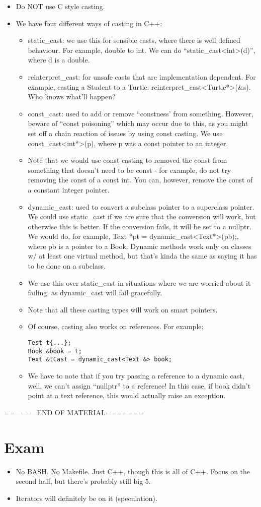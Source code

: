 \documentclass{article}
\begin{document}
\begin{itemize}
\item Do NOT use C style casting.
\item We have four different ways of casting in C++:
\begin{itemize}
\item static_cast: we use this for sensible casts, where there is well defined behaviour.  For example, double to int.  We can do ``static_cast<int>(d)'', where d is a double.
\item reinterpret_cast: for unsafe casts that are implementation dependent.  For example, casting a Student to a Turtle: reinterpret_cast<Turtle*>(&s).  Who knows what'll happen?
\item const_cast: used to add or remove ``constness' from something.  However, beware of ``const poisoning'' which may occur due to this, as you might set off a chain reaction of issues by using const casting.  We use const_cast<int*>(p), where p was a const pointer to an integer.  
\item Note that we would use const casting to removed the const from something that doesn't need to be const - for example, do not try removing the const of a const int.  You can, however, remove the const of a constant integer pointer.
\item dynamic_cast: used to convert a subclass pointer to a superclass pointer.  We could use static_cast if we are sure that the conversion will work, but otherwise this is better.  If the conversion fails, it will be set to a nullptr.  We would do, for example, Text *pt = dynamic_cast<Text*>(pb);, where pb is a pointer to a Book.  Dynamic methods work only on classes w/ at least one virtual method, but that's kinda the same as saying it has to be done on a subclass.  
\item We use this over static_cast in situations where we are worried about it failing, as dynamic_cast will fail gracefully.
\item Note that all these casting types will work on smart pointers.
\item Of course, casting also works on references.  For example:
\begin{lstlisting}
Test t{...};
Book &book = t;
Text &tCast = dynamic_cast<Text &> book;
\end{lstlisting}
\item We have to note that if you try passing a reference to a dynamic cast, well, we can't assign ``nullptr'' to a reference!  In this case, if book didn't point at a text reference, this would actually raise an exception.
\end{itemize}
\end{itemize}

======END OF MATERIAL=======

\section{Exam}
\begin{itemize}
\item No BASH.  No Makefile.  Just C++, though this is all of C++.  Focus on the second half, but there's probably still big 5.
\item Iterators will definitely be on it (speculation).

\end{itemize}
\end{document}
